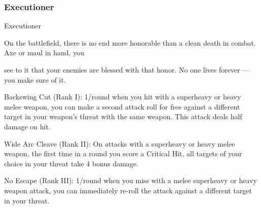 \subsubsection{Executioner}

                                                Executioner

On the battlefield, there is no end more honorable than a clean death in combat. Axe or maul in hand, you

see to it that your enemies are blessed with that honor. No one lives forever — you make sure of it.

Backswing Cut (Rank I): 1/round when you hit with a superheavy or heavy melee weapon, you
can make a second attack roll for free against a different target in your weapon’s threat with the
same weapon. This attack deals half damage on hit.

Wide Arc Cleave (Rank II): On attacks with a superheavy or heavy melee weapon, the first time
in a round you score a Critical Hit, all targets of your choice in your threat take 4 bonus damage.

No Escape (Rank III): 1/round when you miss with a melee superheavy or heavy weapon attack,
you can immediately re-roll the attack against a different target in your threat.